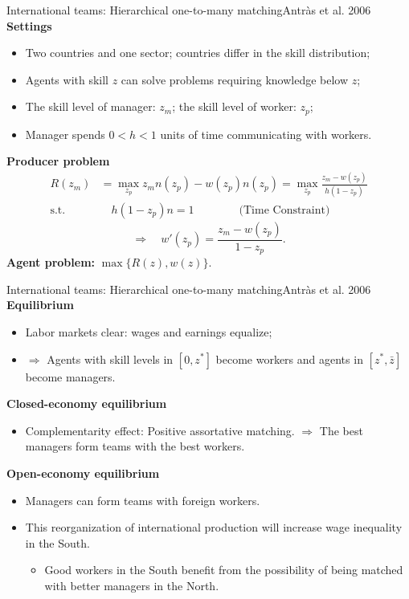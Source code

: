 \documentclass{beamer}
\begin{document}
\begin{frame}{International teams: Hierarchical one-to-many matching}{Antr\`as et al. 2006}
	\textbf{Settings}
	\begin{itemize}
		\item Two countries and one sector; countries differ in the skill distribution;
		\item Agents with skill $z$ can solve problems requiring knowledge below $z$;
		\item The skill level of manager: $z_m$; the skill level of worker: $z_p$;
		\item Manager spends $0<h<1$ units of time communicating with workers.
	\end{itemize}
	\textbf{Producer problem}
	\begin{equation}
		\begin{aligned}
			R(z_m)&=\max_{z_p} z_mn(z_p)-w(z_p)n(z_p)=\max_{z_p} \frac{z_m-w(z_p)}{h(1-z_p)} \\
			\mbox{s.t.}& \quad h(1-z_p)n=1\qquad \qquad \mbox{(Time Constraint)}
		\end{aligned}
	\end{equation}
	\begin{equation}
		\Rightarrow \quad w'(z_p)=\frac{z_m-w(z_p)}{1-z_p}.
	\end{equation}
	\textbf{Agent problem:} $\max \{R(z),w(z)\}$.
\end{frame}
\begin{frame}{International teams: Hierarchical one-to-many matching}{Antr\`as et al. 2006}
	\textbf{Equilibrium}
	\begin{itemize}
		\item Labor markets clear: wages and earnings equalize;
		\item $\Rightarrow$ Agents with skill levels in $[0,z^*]$ become workers and agents in $[z^*,\bar{z}]$ become managers.
	\end{itemize}
	\textbf{Closed-economy equilibrium}
	\begin{itemize}
		\item Complementarity effect: Positive assortative matching. $\Rightarrow$ The best managers form teams with the best workers.
	\end{itemize}
	\textbf{Open-economy equilibrium}
	\begin{itemize}
		\item Managers can form teams with foreign workers.
		\item This reorganization of international production will increase wage inequality in the South.
		\begin{itemize}
			\item Good workers in the South benefit from the possibility of being matched with better managers in the North.
		\end{itemize}
	\end{itemize}
\end{frame}
\end{document}
